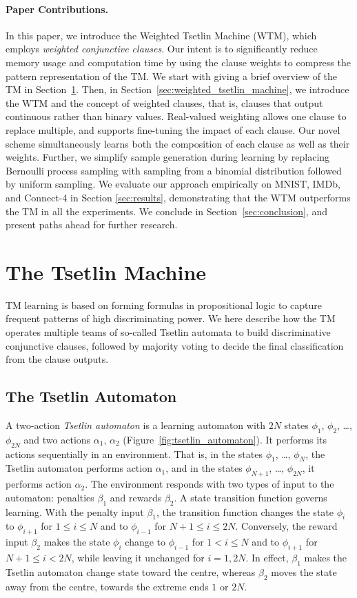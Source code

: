 \documentclass[letterpaper]{article}
\begin{document}
\paragraph{Paper Contributions.} In this paper, we introduce the Weighted Tsetlin Machine (WTM), which employs \emph{weighted conjunctive clauses}. Our intent is to significantly reduce memory usage and computation time by using the clause weights to compress the pattern representation of the TM. We start with giving a brief overview of the TM in Section~\ref{sec:tsetlin_machine}. Then, in Section~\ref{sec:weighted_tsetlin_machine}, we introduce the WTM and the concept of weighted clauses, that is, clauses that output continuous rather than binary values. Real-valued weighting allows one clause to replace multiple, and supports fine-tuning the impact of each clause. Our novel scheme simultaneously learns both the composition of each clause as well as their weights. Further, we simplify sample generation during learning by replacing Bernoulli process sampling with sampling from a binomial distribution followed by uniform sampling. We evaluate our approach empirically on MNIST, IMDb, and Connect-4 in Section \ref{sec:results}, demonstrating that the WTM outperforms the TM in all the experiments. We conclude in Section~\ref{sec:conclusion}, and present paths ahead for further research.

\section{The Tsetlin Machine}
\label{sec:tsetlin_machine}
TM learning is based on forming formulas in propositional logic to capture frequent patterns of high discriminating power. We here describe how the TM operates multiple teams of so-called Tsetlin automata \cite{tsetlin1961behaviour} to build discriminative conjunctive clauses, followed by majority voting to decide the final classification from the clause outputs.
\subsection{The Tsetlin Automaton}
A two-action {\em Tsetlin automaton} \cite{tsetlin1961behaviour,narendra2012learning} is a learning automaton with $2N$ states $\phi_1$, $\phi_2$, \ldots, $\phi_{2N}$ and two actions $\alpha_1$, $\alpha_2$ (Figure~\ref{fig:tsetlin_automaton}). It performs its actions sequentially in an environment. That is, in the states $\phi_1$, \ldots, $\phi_N$, the Tsetlin automaton performs action $\alpha_1$, and in the states $\phi_{N+1}$, \ldots, $\phi_{2N}$, it performs action $\alpha_2$. The environment responds with two types of input to the automaton: penalties $\beta_1$ and rewards $\beta_2$. A state transition function governs learning. With the penalty input $\beta_1$, the transition function changes the state $\phi_i$ to $\phi_{i+1}$ for $1\le i\le N$ and to $\phi_{i-1}$ for $N+1\le i\le2N$. Conversely, the reward input $\beta_2$ makes the state $\phi_i$ change to $\phi_{i-1}$ for $1<i\le N$ and to $\phi_{i+1}$ for $N+1\le i<2N$, while leaving it unchanged for $i=1,2N$. In effect, $\beta_1$ makes the Tsetlin automaton change state toward the centre, whereas $\beta_2$ moves the state away from the centre, towards the extreme ends $1$ or $2N$.
\end{document}
